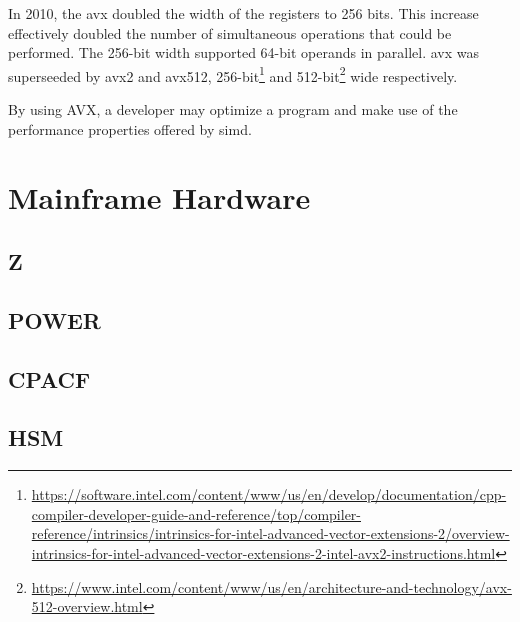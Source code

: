 In 2010, the \gls{avx} doubled the width of the registers to 256 bits. This increase effectively doubled the number of simultaneous operations that could be performed. The 256-bit width supported 64-bit operands in parallel\cite{hennessy2011:avx}. \gls{avx} was superseeded by \gls{avx2} and \gls{avx512}, 256-bit\footnote{\href{https://software.intel.com/content/www/us/en/develop/documentation/cpp-compiler-developer-guide-and-reference/top/compiler-reference/intrinsics/intrinsics-for-intel-advanced-vector-extensions-2/overview-intrinsics-for-intel-advanced-vector-extensions-2-intel-avx2-instructions.html}{https://software.intel.com/content/www/us/en/develop/documentation/cpp-compiler-developer-guide-and-reference/top/compiler-reference/intrinsics/intrinsics-for-intel-advanced-vector-extensions-2/overview-intrinsics-for-intel-advanced-vector-extensions-2-intel-avx2-instructions.html}} and 512-bit\footnote{\href{https://www.intel.com/content/www/us/en/architecture-and-technology/avx-512-overview.html}{https://www.intel.com/content/www/us/en/architecture-and-technology/avx-512-overview.html}} wide respectively.

By using AVX, a developer may optimize a program and make use of the performance properties offered by \gls{simd}\cite{hennessy2011:avx}.

\section{Mainframe Hardware}


\subsection{Z}

\subsection{POWER}

\subsection{CPACF}

\subsection{HSM}
